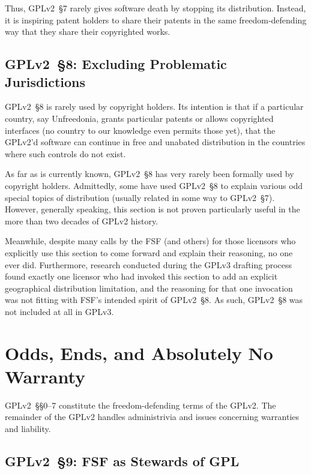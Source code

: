 Thus, GPLv2~\S7 rarely gives software death by stopping its distribution.
Instead, it is inspiring patent holders to share their patents in the same
freedom-defending way that they share their copyrighted works.

\section{GPLv2~\S8: Excluding Problematic Jurisdictions}
\label{GPLv2s8}

GPLv2~\S8 is rarely used by copyright holders.  Its intention is that if a
particular country, say Unfreedonia, grants particular patents or allows
copyrighted interfaces (no country to our knowledge even permits those
yet), that the GPLv2'd software can continue in free and unabated
distribution in the countries where such controls do not exist.

As far as is currently known, GPLv2~\S8 has very rarely been formally used by
copyright holders.  Admittedly, some have used GPLv2~\S8 to explain various
odd special topics of distribution (usually related in some way to
GPLv2~\S7).  However, generally speaking, this section is not proven
particularly useful in the more than two decades of GPLv2 history.

Meanwhile, despite many calls by the FSF (and others) for those licensors who
explicitly use this section to come forward and explain their reasoning, no
one ever did.  Furthermore, research conducted during the GPLv3 drafting
process found exactly one licensor who had invoked this section to add an
explicit geographical distribution limitation, and the reasoning for that one
invocation was not fitting with FSF's intended spirit of GPLv2~\S8.  As such,
GPLv2~\S8 was not included at all in GPLv3.

\chapter{Odds, Ends, and Absolutely No Warranty}

GPLv2~\S\S0--7 constitute the freedom-defending terms of the GPLv2.  The remainder
of the GPLv2 handles administrivia and issues concerning warranties and
liability.

\section{GPLv2~\S9: FSF as Stewards of GPL}
\label{GPLv2s9}

